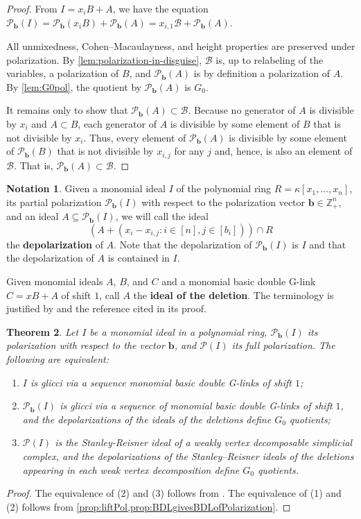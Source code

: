 \documentclass[12pt, reqno]{amsart}
\numberwithin{equation}{section}
\newtheorem{theorem}{Theorem}[section]
\newtheorem{Main Conjecture}[theorem]{Main Conjecture}
\theoremstyle{definition}
\newtheorem{notation}[theorem]{Notation}
\theoremstyle{plain}
\newcommand{\ZZ}{\mathbb{Z}}
\newcommand{\B}{\mathcal{B}}
\renewcommand{\P}{\mathcal{P}}
\newcommand{\bb}{\mathbf{b}}
\begin{document}
\begin{proof}
From $I = x_iB+A$, we have the equation $\P_{\bb}(I) = \P_{\bb}(x_iB)+\P_{\bb}(A) = x_{i,1}\B+\P_{\bb}(A)$.

All unmixedness, Cohen--Macaulayness, and height properties are preserved under polarization.  By \cref{lem:polarization-in-disguise}, $\B$ is, up to relabeling of the variables, a polarization of $B$, and $\P_{\bb}(A)$ is by definition a polarization of $A$. 
 By \cref{lem:G0pol}, the quotient by $\P_{\bb}(A)$ is $G_0$.

 It remains only to show that $\P_{\bb}(A) \subset \B$. 
 Because no generator of $A$ is divisible by $x_i$ and $A \subset B$, each generator of $A$ is divisible by some element of $B$ that is not divisible by $x_i$.  Thus, every element of $\P_{\bb}(A)$ is divisible by some element of $\P_{\bb}(B)$ that is not divisible by $x_{i,j}$ for any $j$ and, hence, is also an element of $\B$.  That is, $\P_{\bb}(A) \subset \B$.
\end{proof}


\begin{notation}\label{not:depolarization} Given a monomial ideal $I$ of the polynomial ring $R = \kappa[x_1, \ldots, x_n]$, its partial polarization $\P_{\bb}(I)$ with respect to the polarization vector $\bb \in \ZZ_+^n$, and an ideal $A \subseteq \P_{\bb}(I)$, we will call the ideal \[
(A+(x_i - x_{i,j} \colon i \in [n], j \in [b_i])) \cap R
\]the \textbf{depolarization} of $A$.  Note  that the depolarization of $\P_{\bb}(I)$ is $I$ and that the depolarization of $A$ is contained in $I$.
\end{notation}


Given monomial ideals $A$, $B$, and $C$ and a monomial basic double G-link $C = xB+A$ of shift $1$, call $A$ the \textbf{ideal of the deletion}.  The terminology is justified by  and the reference \cite[Remark 2.4]{NR08} cited in its proof.  

\begin{theorem}\label{cor:summaryMonomialCase}
Let $I$ be a monomial ideal in a polynomial ring, $\P_{\bb}(I)$ its polarization with respect to the vector $\bb$, and $\P(I)$ its full polarization. The following are equivalent:
\begin{enumerate}
\item $I$ is glicci via a sequence monomial basic double G-links of shift $1$;
\item $\P_{\bb}(I)$ is glicci via a sequence of monomial basic double G-links of shift $1$, and the depolarizations of the ideals of the deletions define $G_0$ quotients;
\item $\P(I)$ is the Stanley-Reisner ideal of a weakly vertex decomposable simplicial complex, and the depolarizations of the Stanley--Reisner ideals of the deletions appearing in each weak vertex decomposition define $G_0$ quotients.
\end{enumerate}
\end{theorem}
\begin{proof}
The equivalence of (2) and (3) follows from \cite[Remark 2.4]{NR08}. The equivalence of (1) and (2) follows from \cref{prop:liftPol,prop:BDLgivesBDLofPolarization}.
\end{proof}
\end{document}
